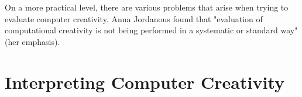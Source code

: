 On a more practical level, there are various problems that arise when trying to evaluate computer creativity. Anna Jordanous found that "evaluation of computational creativity is not being performed in a systematic or standard way" \citep[p.2]{Jordanous2011}(her emphasis).

\section{Interpreting Computer Creativity}

